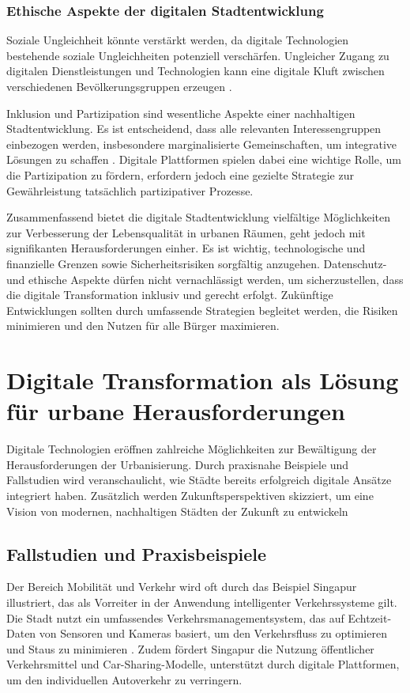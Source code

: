 \documentclass[conference,compsoc,final,a4paper, onecolumn, 11pt]{IEEEtran}
\begin{document}
\subsubsection{Ethische Aspekte der digitalen Stadtentwicklung}
Soziale Ungleichheit könnte verstärkt werden, da digitale Technologien bestehende soziale Ungleichheiten potenziell verschärfen. 
Ungleicher Zugang zu digitalen Dienstleistungen und Technologien kann eine digitale Kluft zwischen verschiedenen Bevölkerungsgruppen erzeugen \autocite{Helsper2012}.

Inklusion und Partizipation sind wesentliche Aspekte einer nachhaltigen Stadtentwicklung. 
Es ist entscheidend, dass alle relevanten Interessengruppen einbezogen werden, insbesondere marginalisierte Gemeinschaften, um integrative Lösungen zu schaffen \autocite{Arnstein1969}. 
Digitale Plattformen spielen dabei eine wichtige Rolle, um die Partizipation zu fördern, erfordern jedoch eine gezielte Strategie zur Gewährleistung tatsächlich partizipativer Prozesse.

Zusammenfassend bietet die digitale Stadtentwicklung vielfältige Möglichkeiten zur Verbesserung der Lebensqualität in urbanen Räumen, geht jedoch mit signifikanten Herausforderungen einher. 
Es ist wichtig, technologische und finanzielle Grenzen sowie Sicherheitsrisiken sorgfältig anzugehen. 
Datenschutz- und ethische Aspekte dürfen nicht vernachlässigt werden, um sicherzustellen, dass die digitale Transformation inklusiv und gerecht erfolgt. 
Zukünftige Entwicklungen sollten durch umfassende Strategien begleitet werden, die Risiken minimieren und den Nutzen für alle Bürger maximieren.


\section{Digitale Transformation als Lösung für urbane Herausforderungen}
Digitale Technologien eröffnen zahlreiche Möglichkeiten zur Bewältigung der Herausforderungen der Urbanisierung. 
Durch praxisnahe Beispiele und Fallstudien wird veranschaulicht, wie Städte bereits erfolgreich digitale Ansätze integriert haben. 
Zusätzlich werden Zukunftsperspektiven skizziert, um eine Vision von modernen, nachhaltigen Städten der Zukunft zu entwickeln

\subsection{Fallstudien und Praxisbeispiele}
Der Bereich Mobilität und Verkehr wird oft durch das Beispiel Singapur illustriert, das als Vorreiter in der Anwendung intelligenter Verkehrssysteme gilt. 
Die Stadt nutzt ein umfassendes Verkehrsmanagementsystem, das auf Echtzeit-Daten von Sensoren und Kameras basiert, um den Verkehrsfluss zu optimieren und Staus zu minimieren \autocite{Chin2020}. 
Zudem fördert Singapur die Nutzung öffentlicher Verkehrsmittel und Car-Sharing-Modelle, unterstützt durch digitale Plattformen, um den individuellen Autoverkehr zu verringern.
\end{document}
